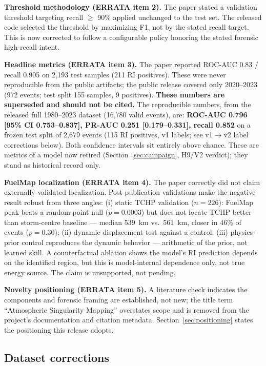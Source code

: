 \documentclass[11pt]{article}
\begin{document}
\textbf{Threshold methodology (ERRATA item 2).} The paper stated a validation
threshold targeting recall $\geq$ 90\% applied unchanged to the test set. The
released code selected the threshold by maximizing F1, not by the stated recall
target. This is now corrected to follow a configurable policy honoring the
stated forensic high-recall intent.

\textbf{Headline metrics (ERRATA item 3).} The paper reported ROC-AUC 0.83 /
recall 0.905 on 2{,}193 test samples (211 RI positives). These were never
reproducible from the public artifacts; the public release covered only
2020--2023 (972 events; test split 155 samples, 9 positives). \textbf{These
numbers are superseded and should not be cited.} The reproducible numbers, from
the released full 1980--2023 dataset (16{,}780 valid events), are:
\textbf{ROC-AUC 0.796 [95\% CI 0.753--0.837], PR-AUC 0.251 [0.179--0.331],
recall 0.852} on a frozen test split of 2{,}679 events (115 RI positives, v1
labels; see v1$\to$v2 label corrections below). Both confidence intervals sit
entirely above chance. These are metrics of a model now retired
(Section~\ref{sec:campaign}, H9/V2 verdict); they stand as historical record
only.

\textbf{FuelMap localization (ERRATA item 4).} The paper correctly did not
claim externally validated localization. Post-publication validations make the
negative result robust from three angles: (i) static TCHP validation ($n=226$):
FuelMap peak beats a random-point null ($p=0.0003$) but does not locate TCHP
better than storm-centre baseline --- median 539~km vs.\ 561~km, closer in 46\%
of events ($p=0.30$); (ii) dynamic displacement test against a control; (iii)
physics-prior control reproduces the dynamic behavior --- arithmetic of the
prior, not learned skill. A counterfactual ablation shows the model's RI
prediction depends on the identified region, but this is model-internal
dependence only, not true energy source. The claim is unsupported, not pending.

\textbf{Novelty positioning (ERRATA item 5).} A literature check indicates the
components and forensic framing are established, not new; the title term
``Atmospheric Singularity Mapping'' overstates scope and is removed from the
project's documentation and citation metadata.
Section~\ref{sec:positioning} states the positioning this release adopts.

\subsection{Dataset corrections}
\end{document}
